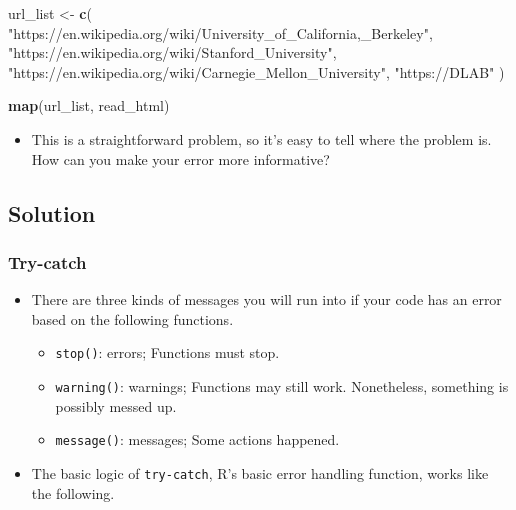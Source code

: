 \documentclass[
]{book}
\newenvironment{Shaded}{\begin{snugshade}}{\end{snugshade}}
\newcommand{\FunctionTok}[1]{\textcolor[rgb]{0.13,0.29,0.53}{\textbf{#1}}}
\newcommand{\NormalTok}[1]{#1}
\newcommand{\OtherTok}[1]{\textcolor[rgb]{0.56,0.35,0.01}{#1}}
\newcommand{\StringTok}[1]{\textcolor[rgb]{0.31,0.60,0.02}{#1}}
\providecommand{\tightlist}{%
  \setlength{\itemsep}{0pt}\setlength{\parskip}{0pt}}
\begin{document}
\begin{Shaded}
\begin{Highlighting}[]
\NormalTok{url\_list }\OtherTok{\textless{}{-}} \FunctionTok{c}\NormalTok{(}
  \StringTok{"https://en.wikipedia.org/wiki/University\_of\_California,\_Berkeley"}\NormalTok{,}
  \StringTok{"https://en.wikipedia.org/wiki/Stanford\_University"}\NormalTok{,}
  \StringTok{"https://en.wikipedia.org/wiki/Carnegie\_Mellon\_University"}\NormalTok{,}
  \StringTok{"https://DLAB"}
\NormalTok{)}
\end{Highlighting}
\end{Shaded}

\begin{Shaded}
\begin{Highlighting}[]
\FunctionTok{map}\NormalTok{(url\_list, read\_html)}
\end{Highlighting}
\end{Shaded}

\begin{itemize}
\tightlist
\item
  This is a straightforward problem, so it's easy to tell where the problem is. How can you make your error more informative?
\end{itemize}

\subsection{Solution}\label{solution-1}

\subsubsection{Try-catch}\label{try-catch}

\begin{itemize}
\item
  There are three kinds of messages you will run into if your code has an error based on the following functions.

  \begin{itemize}
  \tightlist
  \item
    \texttt{stop()}: errors; Functions must stop.
  \item
    \texttt{warning()}: warnings; Functions may still work. Nonetheless, something is possibly messed up.
  \item
    \texttt{message()}: messages; Some actions happened.
  \end{itemize}
\item
  The basic logic of \texttt{try-catch}, R's basic error handling function, works like the following.
\end{itemize}
\end{document}
